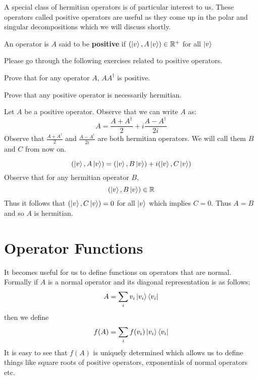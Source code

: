 A special class of hermitian operators is of particular interest to us. These operators called positive operators are useful as they come up in the polar and singular decompositions which we will discuss shortly.
\begin{definition}
An operator is $A$ said to be \textbf{positive} if $(\ket{v}, A\ket{v}) \in \mathbb{R}^{+}$ for all $\ket{v}$
\end{definition}

Please go through the following exercises related  to positive operators.
\begin{exercise}
Prove that for any operator $A$, $AA^\dagger$ is positive.
\end{exercise}
\begin{exercise}
Prove that any positive operator is necessarily hermitian.
\end{exercise}
\begin{solution}
Let  $A$ be a positive operator. Observe that we can write  $A$ as:
$$ A = \frac{A+A^\dagger}{2} + i\frac{A-A^\dagger}{2i}$$
Observe that $\frac{A+A^\dagger}{2}$ and $\frac{A-A^\dagger}{2i}$ are both hermitian operators. We will call them $B$ and $C$ from now on.

$$(\ket{v}, A\ket{v}) = (\ket{v}, B\ket{v}) + i(\ket{v}, C\ket{v})$$
Observe that for any hermitian operator $B$, 
$$ (\ket{v}, B\ket{v}) \in \mathbb{R}$$
Thus it follows that $ (\ket{v}, C\ket{v}) = 0$ for all $\ket{v}$ which implies $C = 0$. Thus $A = B$ and so $A$ is hermitian.
\end{solution}

\section{Operator Functions}
It becomes useful for us to define functions on operators that are normal. Formally if $A$ is a normal operator and its diagonal representation is as follows:
$$ A = \sum_i v_i \ket{v_i}\bra{v_i}$$ 
then we define $$f(A) = \sum_i f(v_i) \ket{v_i}\bra{v_i}$$
It is easy to see that $f(A)$ is uniquely determined which allows us to define things like square roots of positive operators, exponentials of normal operators etc.

